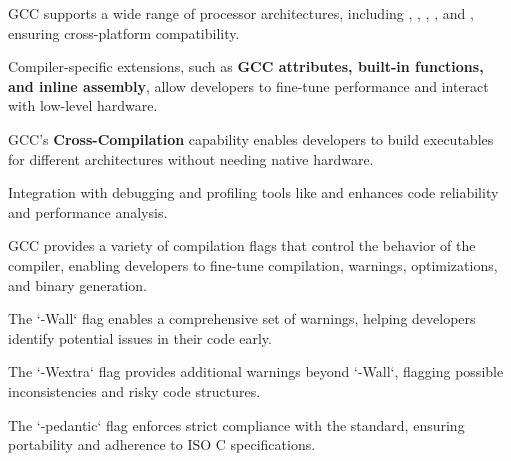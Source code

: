 \begin{NxSSSSBox}
	\begin{NxIDBox}
	GCC supports a wide range of processor architectures, including , , , , and , ensuring cross-platform compatibility.
	\end{NxIDBox}
	\begin{NxIDBox}
		Compiler-specific extensions, such as \textbf{GCC attributes, built-in functions, and inline assembly}, allow developers to fine-tune performance and interact with low-level hardware.
	\end{NxIDBox}
	\begin{NxIDBox}
		GCC’s \textbf{Cross-Compilation} capability enables developers to build executables for different architectures without needing native hardware.
	\end{NxIDBox}
	\begin{NxIDBox}
		Integration with debugging and profiling tools like  and  enhances code reliability and performance analysis.
	\end{NxIDBox}
\end{NxSSSSBox}

\begin{NxSSSSBox}
	\begin{NxIDBox}
		GCC provides a variety of compilation flags that control the behavior of the compiler, enabling developers to fine-tune compilation, warnings, optimizations, and binary generation.
	\end{NxIDBox}
	\begin{NxIDBox}
		The `-Wall` flag enables a comprehensive set of warnings, helping developers identify potential issues in their code early.
	\end{NxIDBox}
	\begin{NxIDBox}
		The `-Wextra` flag provides additional warnings beyond `-Wall`, flagging possible inconsistencies and risky code structures.
	\end{NxIDBox}
	\begin{NxIDBox}
		The `-pedantic` flag enforces strict compliance with the standard, ensuring portability and adherence to ISO C specifications.
	\end{NxIDBox}
\end{NxSSSSBox}

